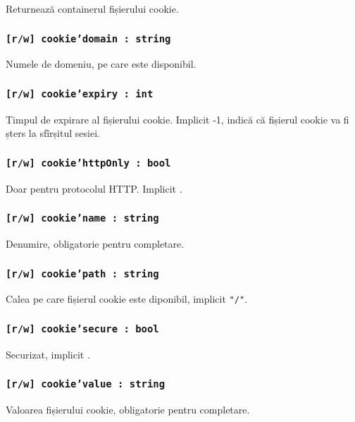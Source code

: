 Returnează containerul fișierului cookie.

\subsubsection{\texttt{[r/w] cookie'domain : string}}

Numele de domeniu, pe care \cookie{} este disponibil.

\subsubsection{\texttt{[r/w] cookie'expiry : int}}

Timpul de expirare al fișierului cookie. Implicit -1, indică că fișierul cookie va fi șters la sfîrșitul sesiei.

\subsubsection{\texttt{[r/w] cookie'httpOnly : bool}}

Doar pentru protocolul HTTP. Implicit \false.

\subsubsection{\texttt{[r/w] cookie'name : string}}

Denumire, obligatorie pentru completare.

\subsubsection{\texttt{[r/w] cookie'path : string}}

Calea pe care fișierul cookie este diponibil, implicit \texttt{"/"}.

\subsubsection{\texttt{[r/w] cookie'secure : bool}}

Securizat, implicit \false.

\subsubsection{\texttt{[r/w] cookie'value : string}}

Valoarea fișierului cookie, obligatorie pentru completare.

